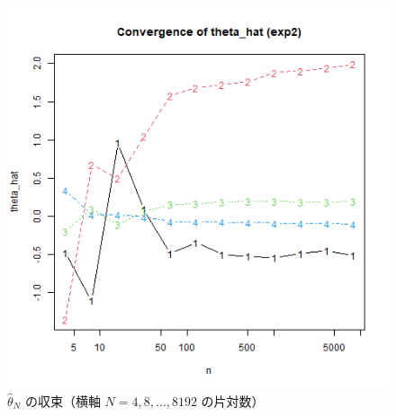 \begin{figure}[H]
  \centering
  \includegraphics[width=0.75\linewidth]{graphs/task2.png}
  \caption{$\hat\theta_N$ の収束（横軸 $N=4,8,\dots,8192$ の片対数）}
  \label{fig:task2-conv}
\end{figure}


